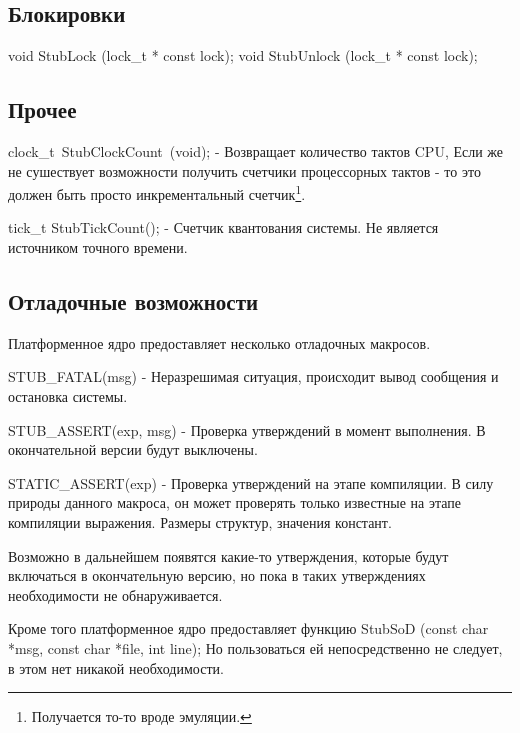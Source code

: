 \subsection{Блокировки}

void StubLock (lock\_t * const lock);
void StubUnlock (lock\_t * const lock);

\subsection{Прочее}

clock\_t~StubClockCount~(void); - Возвращает количество тактов CPU, Если же не
сушествует возможности получить счетчики процессорных тактов - то это должен
быть просто инкрементальный счетчик\footnote{Получается то-то вроде эмуляции.}.

tick\_t StubTickCount(); - Счетчик квантования системы. Не является источником
точного времени.

\subsection{Отладочные возможности}

Платформенное ядро предоставляет несколько отладочных макросов.

STUB\_FATAL(msg) - Неразрешимая ситуация, происходит вывод сообщения и остановка
системы.

STUB\_ASSERT(exp, msg) - Проверка утверждений в момент выполнения. В
окончательной версии будут выключены.

STATIC\_ASSERT(exp) - Проверка утверждений на этапе компиляции. В силу природы
данного макроса, он может проверять только известные на этапе компиляции
выражения. Размеры структур, значения констант.

Возможно в дальнейшем появятся какие-то утверждения, которые будут включаться в
окончательную версию, но пока в таких утверждениях необходимости не
обнаруживается.

Кроме того платформенное ядро предоставляет функцию StubSoD (const char *msg,
const char *file, int line); Но пользоваться ей непосредственно не следует,
в этом нет никакой необходимости.
